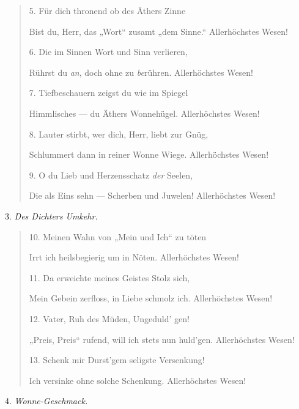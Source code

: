 \documentclass{article}
\begin{document}
\begin{quotation}\small
5. Für dich thronend ob des Äthers Zinne

Bist du, Herr, das „Wort“ zusamt „dem Sinne.“ Allerhöchstes Wesen!

\bigskip

6. Die im Sinnen Wort und Sinn verlieren,

Rührst du \emph{an}, doch ohne zu \emph{be}rühren. Allerhöchstes Wesen!

\bigskip

7. Tiefbeschauern zeigst du wie im Spiegel

Himmlisches — du Äthers Wonnehügel. Allerhöchstes Wesen!

\bigskip

8. Lauter stirbt, wer dich, Herr, liebt zur Gnüg,

Schlummert dann in reiner Wonne Wiege. Allerhöchstes Wesen!

\bigskip

9. O du Lieb und Herzensschatz \emph{der} Seelen,

Die als Eins sehn — Scherben und Juwelen! Allerhöchstes Wesen!
\end{quotation}
\begin{center}
3. \emph{Des Dichters Umkehr.}
\end{center}
\begin{quotation}\small
10. Meinen Wahn von „Mein und Ich“ zu töten

Irrt ich heilsbegierig um in Nöten. Allerhöchstes Wesen!

\bigskip

11. Da erweichte meines Geistes Stolz sich,

Mein Gebein zerfloss, in Liebe schmolz ich. Allerhöchstes Wesen!

\bigskip

12. Vater, Ruh des Müden, Ungeduld' gen!

„Preis, Preis“ rufend, will ich stets nun huld'gen. Allerhöchstes Wesen!

\bigskip

13. Schenk mir Durst'gem seligste Versenkung!

Ich versinke ohne solche Schenkung. Allerhöchstes Wesen!
\end{quotation}
\begin{center}
4. \emph{Wonne-Geschmack.}
\end{center}
\end{document}
